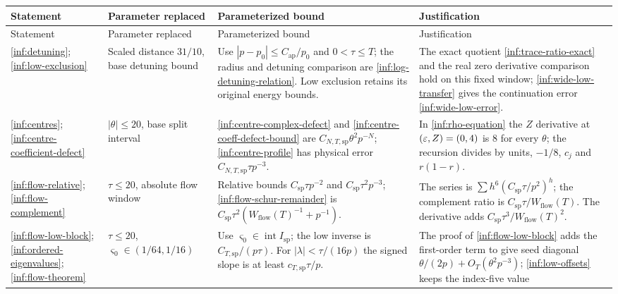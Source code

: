 \begin{lemma}
\begingroup\small\normalfont
\setlength{\tabcolsep}{4pt}
\renewcommand{\arraystretch}{1.16}
\begin{longtable}{@{}>{\raggedright\arraybackslash}p{}>{\raggedright\arraybackslash}p{}>{\raggedright\arraybackslash}p{}>{\raggedright\arraybackslash}p{}@{}}
\toprule Statement & Parameter replaced & Parameterized bound & Justification\\\midrule
\endfirsthead
\toprule Statement & Parameter replaced & Parameterized bound & Justification\\\midrule
\endhead
\ref{inf:detuning};
\ref{inf:low-exclusion}
& Scaled distance $31/10$, base detuning bound
& Use $|p-p_0|\le C_{\mathrm{ap}}/p_0$ and
$0<\tau\le T$; the radius and detuning comparison are
\eqref{inf:log-detuning-relation}. Low exclusion retains its
original energy bounds.
& The exact quotient \eqref{inf:trace-ratio-exact} and the real
zero derivative comparison hold on this fixed window;
\ref{inf:wide-low-transfer} gives the continuation error
\eqref{inf:wide-low-error}.\\
\ref{inf:centres};
\ref{inf:centre-coefficient-defect}
& $|\theta|\le20$, base split interval
& \eqref{inf:centre-complex-defect} and
\eqref{inf:centre-coeff-defect-bound} are
$C_{N,T,\mathrm{sp}}\theta^2p^{-N}$;
\eqref{inf:centre-profile} has physical error
$C_{N,T,\mathrm{sp}}\tau p^{-3}$.
& In \eqref{inf:rho-equation} the $Z$ derivative at $(\varepsilon,Z)=(0,4)$
is $8$ for every $\theta$; the recursion divides by
units, $-1/8$, $c_j$ and $r(1-r)$.\\
\ref{inf:flow-relative};
\ref{inf:flow-complement}
& $\tau\le20$, absolute flow window
& Relative bounds $C_{\mathrm{sp}}\tau p^{-2}$ and
$C_{\mathrm{sp}}\tau^2p^{-3}$;
\eqref{inf:flow-schur-remainder} is
$C_{\mathrm{sp}}\tau^2(W_{\mathrm{flow}}(T)^{-1}+p^{-1})$.
& The series is $\sum h^6(C_{\mathrm{sp}}\tau/p^2)^h$;
the complement ratio is $C_{\mathrm{sp}}\tau/W_{\mathrm{flow}}(T)$.
The derivative adds $C_{\mathrm{sp}}\tau^3/W_{\mathrm{flow}}(T)^2$.\\
\ref{inf:flow-low-block};
\ref{inf:ordered-eigenvalues};
\ref{inf:flow-theorem}
& $\tau\le20$, $\varsigma_0\in(1/64,1/16)$
& Use $\varsigma_0\in\operatorname{int}I_{\mathrm{sp}}$;
the low inverse is $C_{T,\mathrm{sp}}/(p\tau)$.
For $|\lambda|<\tau/(16p)$ the signed slope is
at least $c_{T,\mathrm{sp}}\tau/p$.
& The proof of \ref{inf:flow-low-block} adds the first-order term
to give seed diagonal $\theta/(2p)+O_T(\theta^2p^{-3})$;
\eqref{inf:low-offsets} keeps the index-five value

\end{longtable}
\end{lemma}
